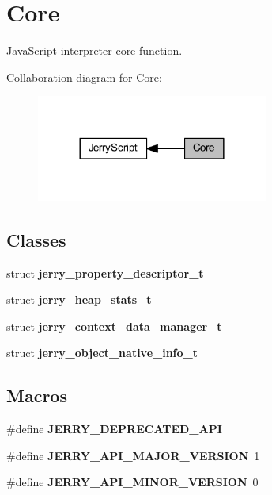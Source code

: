 \section{Core}
\label{group___core}


Java\+Script interpreter core function.  


Collaboration diagram for Core\+:
\nopagebreak
\begin{figure}[H]
\begin{center}
\leavevmode
\includegraphics[width=216pt]{group___core}
\end{center}
\end{figure}
\subsection*{Classes}
\begin{DoxyCompactItemize}
\item 
struct \textbf{ jerry\+\_\+property\+\_\+descriptor\+\_\+t}
\item 
struct \textbf{ jerry\+\_\+heap\+\_\+stats\+\_\+t}
\item 
struct \textbf{ jerry\+\_\+context\+\_\+data\+\_\+manager\+\_\+t}
\item 
struct \textbf{ jerry\+\_\+object\+\_\+native\+\_\+info\+\_\+t}
\end{DoxyCompactItemize}
\subsection*{Macros}
\begin{DoxyCompactItemize}
\item 
\#define \textbf{ J\+E\+R\+R\+Y\+\_\+\+D\+E\+P\+R\+E\+C\+A\+T\+E\+D\+\_\+\+A\+PI}
\item 
\#define \textbf{ J\+E\+R\+R\+Y\+\_\+\+A\+P\+I\+\_\+\+M\+A\+J\+O\+R\+\_\+\+V\+E\+R\+S\+I\+ON}~1
\item 
\#define \textbf{ J\+E\+R\+R\+Y\+\_\+\+A\+P\+I\+\_\+\+M\+I\+N\+O\+R\+\_\+\+V\+E\+R\+S\+I\+ON}~0
\end{DoxyCompactItemize}
